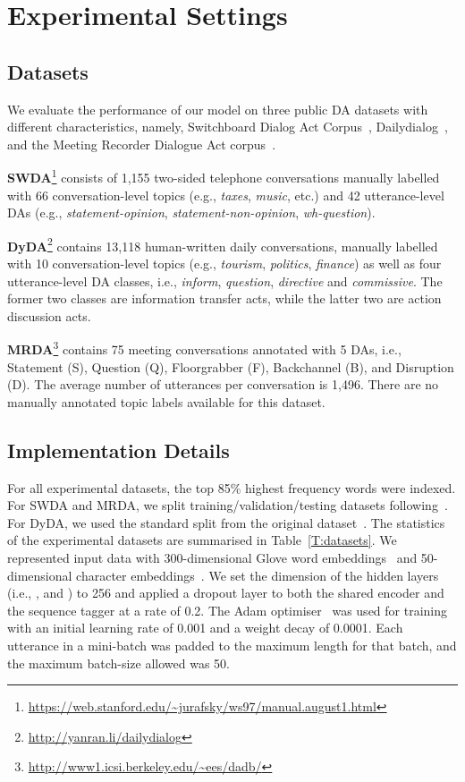 \documentclass[11pt,a4paper]{article}
\begin{document}
\section{Experimental Settings}

\subsection{Datasets}
We evaluate the performance of our model on three public DA datasets with different characteristics, namely, Switchboard Dialog Act Corpus~\cite[SWDA]{jurafsky1997switchboard}, Dailydialog~\cite[DyDA]{li2017dailydialog}, and the Meeting Recorder Dialogue Act corpus~\cite[MRDA]{janin2003icsi}. 

\noindent \textbf{SWDA}\footnote{\url{https://web.stanford.edu/~jurafsky/ws97/manual.august1.html}} consists of 1,155 two-sided telephone conversations manually labelled with 66 conversation-level topics (e.g., \textit{taxes}, \textit{music}, etc.) and 42 utterance-level DAs (e.g., \textit{statement-opinion}, \textit{statement-non-opinion}, \textit{wh-question}). 


\noindent \textbf{DyDA}\footnote{\url{http://yanran.li/dailydialog}} contains 13,118 human-written daily conversations, manually labelled with 10 conversation-level topics (e.g., \textit{tourism}, \textit{politics}, \textit{finance}) as well as four utterance-level DA classes, i.e., \textit{inform}, \textit{question}, \textit{directive} and \textit{commissive}. The former two classes are information transfer acts,  while the latter two are action discussion acts. 


\noindent \textbf{MRDA}\footnote{\url{http://www1.icsi.berkeley.edu/~ees/dadb/}}  contains 75 meeting conversations annotated with 5 DAs, i.e., Statement (S), Question (Q), Floorgrabber (F), Backchannel (B), and Disruption (D). The average number of utterances per conversation is 1,496. There are no manually annotated topic labels available for this dataset. 

\subsection{Implementation Details}
For all experimental datasets, the top 85\% highest frequency words were indexed. For SWDA and MRDA, we split training/validation/testing datasets following~\cite{stolcke2000dialogue,lee2016sequential}.
For DyDA, we  used the standard split from the original dataset~\cite{li2017dailydialog}.
The statistics of the experimental datasets are summarised in Table~\ref{T:datasets}. 
We represented input data with 300-dimensional Glove word embeddings~\cite{pennington2014glove} and 50-dimensional character embeddings~\cite{ma2016end}. 
We set the dimension of the hidden layers (i.e., ,  and ) to 256 and applied a dropout layer to both the shared encoder and the sequence tagger at a rate of 0.2. The Adam optimiser~\cite{kingma2014adam} was used for training with an initial learning rate of 0.001 and a weight decay of 0.0001. 
Each utterance in a mini-batch was padded to the maximum length for that batch, and the maximum batch-size allowed was 50.
\end{document}
